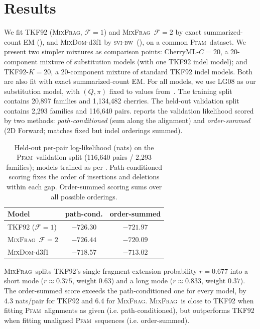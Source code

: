 \documentclass[11pt]{article}
\newcommand{\MixFrag}{\textsc{MixFrag}}
\newcommand{\MixDom}{\textsc{MixDom}}
\newcommand{\Pfam}{\textsc{Pfam}}
\newcommand{\eqm}{\pi}
\newcommand{\svibw}{\textsc{svi-bw}}
\begin{document}
\section{Results}
\label{sec:results}

We fit TKF92 (\MixFrag, $\mathcal F{=}1$) and \MixFrag\ $\mathcal F{=}2$ by
exact summarized-count EM (), and \MixDom-d3f1 by \svibw\
(), on a common \Pfam\ dataset.
We present two simpler mixtures as comparison points: CherryML-$C{=}20$, a 20-component mixture of substitution models (with one TKF92 indel model); and TKF92-$K{=}20$, a 20-component mixture of standard TKF92 indel models.
Both are also fit with exact summarized-count EM.
For all models, we use LG08 as our substitution model, with $(Q,\eqm)$ fixed to values from~\citet{LG08}.
The training split contains 20{,}897 families and
1{,}134{,}482 cherries.
The held-out validation split contains 2{,}293 families and 116{,}640 pairs.
\Cref{tab:pfam} reports the validation likelihood scored by two methods:
\emph{path-conditioned} (sum along the alignment) and
\emph{order-summed} (2D Forward; matches fixed but indel orderings summed).

\begin{table}[t]
\caption{Held-out per-pair log-likelihood
(nats) on the \Pfam\ validation split (116{,}640 pairs / 2{,}293
families); models trained as per \Cref{sec:results}. 
 Path-conditioned scoring fixes the order of insertions and deletions within each gap. Order-summed scoring sums over all possible orderings. }
\label{tab:pfam}
\centering
\setlength{\tabcolsep}{5pt}
\begin{tabular}{@{}lcc@{}}
\toprule
Model & path-cond. & \textbf{order-summed} \\
\midrule
TKF92 ($\mathcal F{=}1$) & $-726.30$ & $-721.97$ \\
\MixFrag\ $\mathcal F{=}2$ & $-726.44$ & $-720.09$ \\
\MixDom-d3f1 & $\mathbf{-718.57}$ & $\mathbf{-713.02}$ \\
\bottomrule
\end{tabular}
\end{table}

\MixFrag\ splits
TKF92's single fragment-extension probability $r{=}0.677$ into a short mode ($r{\approx}0.375$,
weight $0.63$) and a long mode ($r{\approx}0.833$, weight $0.37$). 
The order-summed score exceeds the path-conditioned one for every model, by 4.3 nats/pair for TKF92 and 6.4 for \MixFrag.
\MixFrag\ is close to TKF92 when fitting \Pfam\ alignments as given (i.e. path-conditioned), but outperforms TKF92 when fitting unaligned \Pfam\ sequences (i.e. order-summed).
\end{document}
